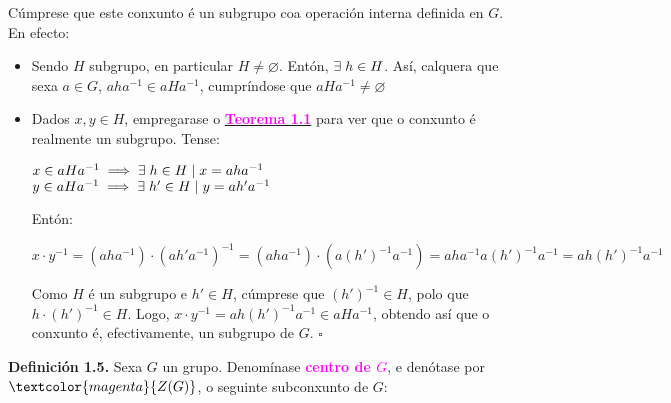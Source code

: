\documentclass[twoside]{report}
\newcommand{\magbf}[1]{\textcolor{magenta}{\textbf{#1}}} %
\theoremstyle{mystyle}
\begin{document}
\begin{center}
\end{center}

\vspace{1mm}

\noindent Cúmprese que este conxunto é un subgrupo coa operación interna definida en $G$. En efecto:

\begin{itemize}
    \item Sendo $H$ subgrupo, en particular $H \neq \varnothing$. Entón, $\exists \hspace{1mm} h \in H$. Así, calquera que sexa $a \in G$, $aha^{-1} \in aHa^{-1}$, cumpríndose que $aHa^{-1} \neq \varnothing$
    \item Dados $x,y \in H$, empregarase o \hyperref[th1.1]{\magbf{Teorema 1.1}} para ver que o conxunto é realmente un subgrupo. Tense:
    
    $x \in aHa^{-1} \implies \exists \hspace{1mm} h \in H \hspace{1mm} | \hspace{1mm} x = aha^{-1}$\\
    $y \in aHa^{-1} \implies \exists \hspace{1mm} h' \in H \hspace{1mm} | \hspace{1mm} y = ah'a^{-1}$
    
    Entón:
    
    $x \cdot y^{-1} = (aha^{-1}) \cdot (ah'a^{-1})^{-1} = (aha^{-1}) \cdot (a(h')^{-1}a^{-1}) = aha^{-1}a(h')^{-1}a^{-1} = ah(h')^{-1}a^{-1}$ 
    
    Como $H$ é un subgrupo e $h' \in H$, cúmprese que $(h')^{-1} \in H$, polo que $h \cdot (h')^{-1} \in H$. Logo, $x \cdot y^{-1} = ah(h')^{-1}a^{-1} \in aHa^{-1}$, obtendo así que o conxunto é, efectivamente, un subgrupo de $G$. $\square$
\end{itemize}

\vspace{3mm}

\noindent \textbf{Definición 1.5.} Sexa $G$ un grupo. Denomínase \textcolor{magenta}{\textbf{centro de $G$}}, e denótase por $\textcolor{magenta}{Z(G)}$, o seguinte subconxunto de $G$:

\begin{center}
\end{center}
\end{document}
